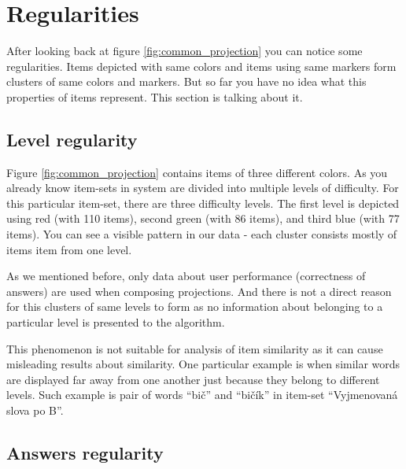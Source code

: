 \documentclass[
  digital, %
  table,   %
  nolof,     %
  nolot,     %
  nocover
]{fithesis3}
\begin{document}

\section{Regularities}\label{regularities}


After looking back at figure \ref{fig:common_projection} you can notice some regularities. Items depicted with same colors and items using same markers form clusters of same colors and markers. But so far you have no idea what this properties of items represent. This section is talking about it.


\subsection{Level regularity}\label{regularities-level-regularity}


Figure \ref{fig:common_projection} contains items of three different colors. As you already know item-sets in system \umimeCesky{} are divided into multiple levels of difficulty. For this particular item-set, there are three difficulty levels. The first level is depicted using red (with 110 items), second green (with 86 items), and third blue (with 77 items). You can see a visible pattern in our data - each cluster consists mostly of items item from one level.

As we mentioned before, only data about user performance (correctness of answers) are used when composing projections. And there is not a direct reason for this clusters of same levels to form as no information about belonging to a particular level is presented to the algorithm.


This phenomenon is not suitable for analysis of item similarity as it can cause misleading results about similarity. One particular example is when similar words are displayed far away from one another just because they belong to different levels. Such example is pair of words ``bič'' and ``bičík'' in item-set ``Vyjmenovaná slova po B''.


\subsection{Answers regularity}\label{answers-regularity}
\end{document}
